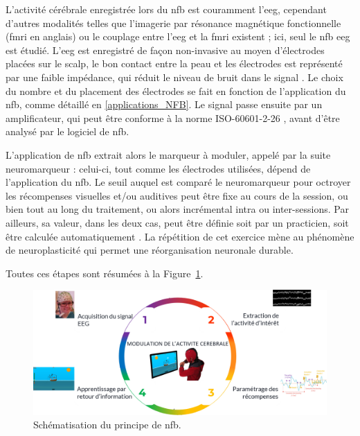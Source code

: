 L'activité cérébrale enregistrée lors du \gls{nfb} est couramment l'\gls{eeg}, cependant d'autres modalités telles que l'imagerie par résonance 
magnétique fonctionnelle (\gls{fmri} en anglais) \citep{Sulzer2013} ou le couplage entre l'\gls{eeg} et la \gls{fmri} \citep{Perronnet2017} existent ; ici,
seul le \gls{nfb} \gls{eeg} est étudié. L'\gls{eeg} est enregistré de façon non-invasive au moyen d'électrodes placées sur le scalp, 
le bon contact entre la peau et les électrodes est représenté par une faible impédance, qui réduit le niveau de bruit dans le 
signal \citep{Kappenman2010}. Le choix du nombre et du placement des électrodes se fait en fonction de l'application du \gls{nfb}, comme détaillé en 
\ref{applications_NFB}. Le signal passe ensuite par un amplificateur, qui peut être conforme à la norme ISO-60601-2-26 \citep{ISO}, avant d'être analysé 
par le logiciel de \gls{nfb}. 

L'application de \gls{nfb} extrait alors le marqueur à moduler, appelé par la suite neuromarqueur : celui-ci, tout comme les électrodes utilisées, 
dépend de l'application du \gls{nfb}. Le seuil auquel est comparé le neuromarqueur pour octroyer les récompenses visuelles et/ou auditives peut être fixe 
au cours de la session, ou bien tout au long du traitement, ou alors incrémental intra ou inter-sessions. Par ailleurs, sa valeur, dans 
les deux cas, peut être définie soit par un practicien, soit être calculée automatiquement \citep{Arns2014}. La répétition de cet exercice mène au phénomène de 
neuroplasticité \citep{VanDoren2017, Ros2010} qui permet une réorganisation neuronale durable.

Toutes ces étapes sont résumées à la Figure~\ref{Figure:introduction_nfb_explications}.

\begin{figure}[h!]
  \centering
	\includegraphics[width=1\linewidth]{figures/chapter-1/introduction-nfb-explication} 
  \caption{Schématisation du principe de \gls{nfb}.}
  \label{Figure:introduction_nfb_explications}
\end{figure}

